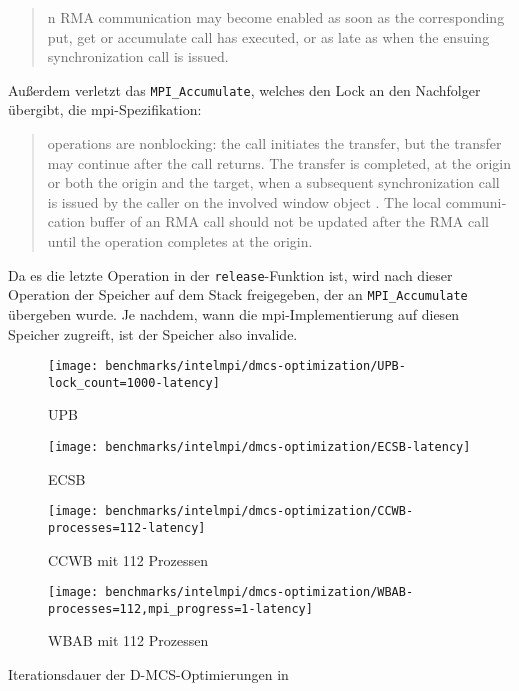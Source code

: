 \foreignblockcquote{english}[Kapitel 11.7.3, S. 462]{MPI-3.1}{%
    n RMA communication may become enabled as soon as the corresponding
    put, get or accumulate call has executed, or as late as when the ensuing synchronization
    call is issued.}
Außerdem verletzt das \texttt{MPI\_Accumulate},
welches den Lock an den Nachfolger übergibt,
die \gls{mpi}-Spezifikation:
\foreignblockcquote{english}[Kapitel 11.3, S. 417]{MPI-3.1}{%
     operations are nonblocking: the
    call initiates the transfer, but the transfer may continue after the call returns. The transfer
    is completed, at the origin or both the origin and the target, when a subsequent synchronization
    call is issued by the caller on the involved window object \textelp{}.
    The local communication buffer of an RMA call should not be updated \textelp{} after the RMA call until the
    operation completes at the origin.}
Da es die letzte Operation in der \texttt{release}-Funktion ist,
wird nach dieser Operation der Speicher auf dem Stack freigegeben,
der an \texttt{MPI\_Accumulate} übergeben wurde.
Je nachdem,
wann die \gls{mpi}-Implementierung auf diesen Speicher zugreift,
ist der Speicher also invalide.

\begin{benchmark}[h]
    \begin{subfigure}{.5\textwidth}
        \texttt{[image: benchmarks/intelmpi/dmcs-optimization/UPB-lock\_count=1000-latency]}
        \caption{UPB}
        \label{ben:dmcs_upb_latency}
    \end{subfigure}
    \begin{subfigure}{.5\textwidth}
        \texttt{[image: benchmarks/intelmpi/dmcs-optimization/ECSB-latency]}
        \caption{ECSB}
        \label{ben:dmcs_ecsb_latency}
    \end{subfigure}
    \begin{subfigure}{.5\textwidth}
        \texttt{[image: benchmarks/intelmpi/dmcs-optimization/CCWB-processes=112-latency]}
        \caption{CCWB mit 112 Prozessen}
        \label{ben:dmcs_ccwb_112_latency}
    \end{subfigure}
    \begin{subfigure}{.5\textwidth}
        \texttt{[image: benchmarks/intelmpi/dmcs-optimization/WBAB-processes=112,mpi\_progress=1-latency]}
        \caption{WBAB mit 112 Prozessen}
        \label{ben:dmcs_wbab_112_latency}
    \end{subfigure}
    \caption{Iterationsdauer der D-MCS-Optimierungen in }
    \label{fig:dmcs_latency}
\end{benchmark}

